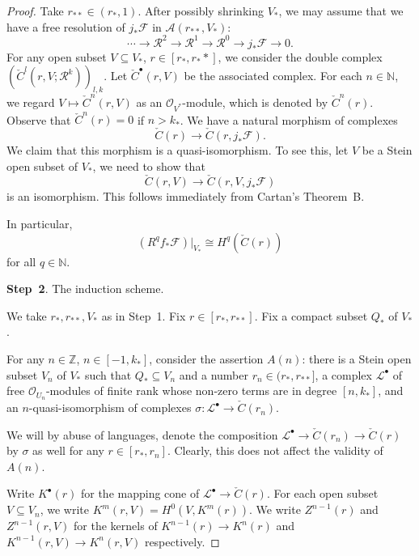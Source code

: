 \begin{proof}
    Take $r_{**}\in (r_*,1)$. After possibly shrinking $V_*$, we may assume that we have a free resolution of $j_*\mathcal{F}$ in $\mathcal{A}(r_{**},V_*)$:\
    \[
        \cdots\rightarrow \mathcal{R}^2\rightarrow \mathcal{R}^1\rightarrow \mathcal{R}^0\rightarrow j_*\mathcal{F}\rightarrow 0.
    \]
    For any open subset $V\subseteq V_*$, $r\in [r_*,r_**]$, we consider the double complex $(\check{C}^l(r,V;\mathcal{R}^k))_{l,k}$. Let $\check{C}^{\bullet}(r,V)$ be the associated complex. For each $n\in \mathbb{N}$, we regard $V\mapsto \check{C}^n(r,V)$ as an $\mathcal{O}_{V^*}$-module, which is denoted by $\check{C}^n(r)$. Observe that $\check{C}^n(r)=0$ if $n>k_*$.  We have a natural morphism of complexes
    \[
        \check{C}(r)\rightarrow \check{C}(r,j_*\mathcal{F}).
    \]
    We claim that this morphism is a quasi-isomorphism. To see this, let $V$ be a Stein open subset of $V_*$, we need to show that 
    \[
        \check{C}(r,V)\rightarrow \check{C}(r,V,j_*\mathcal{F})
    \]
    is an isomorphism. This follows immediately from Cartan's Theorem~B.

    In particular,
    \[
        (R^qf_*\mathcal{F})|_{V_*}\cong H^q(\check{C}(r))
    \]
    for all $q\in \mathbb{N}$.

    \textbf{Step~2}. The induction scheme.

    We take $r_*,r_{**},V_*$ as in Step~1. Fix $r\in [r_*,r_{**}]$. Fix a compact subset $Q_*$ of $V_*$.
    
    For any $n\in \mathbb{Z}$, $n\in [-1,k_*]$, consider the assertion $A(n)$: there is a Stein open subset $V_n$ of $V_*$ such that $Q_*\subseteq V_n$ and a number $r_n\in (r_*,r_{**}]$, a complex $\mathcal{L}^{\bullet}$ of free $\mathcal{O}_{U_n}$-modules of finite rank whose non-zero terms are in degree $[n,k_*]$, and an $n$-quasi-isomorphism of complexes $\sigma:\mathcal{L}^{\bullet}\rightarrow \check{C}(r_n)$.

    We will by abuse of languages, denote the composition $\mathcal{L}^{\bullet}\rightarrow \check{C}(r_n)\rightarrow \check{C}(r)$ by $\sigma$ as well for any $r\in [r_*,r_n]$. Clearly, this does not affect the validity of $A(n)$.

    Write $K^{\bullet}(r)$ for the mapping cone of $\mathcal{L}^{\bullet}\rightarrow \check{C}(r)$. For each open subset $V\subseteq V_n$, we write $K^m(r,V)=H^0(V,K^m(r))$. We write $Z^{n-1}(r)$ and $Z^{n-1}(r,V)$ for the kernels of $K^{n-1}(r)\rightarrow K^n(r)$ and $K^{n-1}(r,V)\rightarrow K^n(r,V)$ respectively.


\end{proof}
